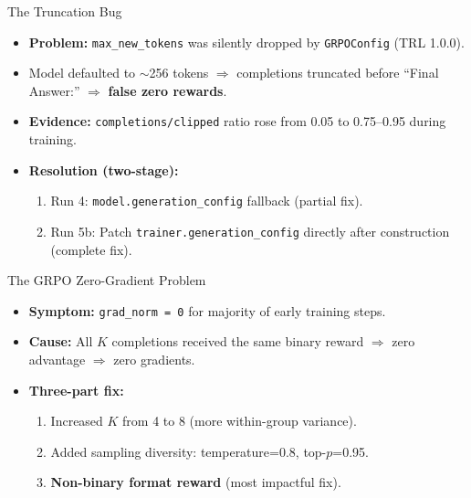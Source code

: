 \documentclass[10pt]{beamer}
\begin{document}
\begin{frame}{The Truncation Bug}
\large
\begin{itemize}
    \item<1-> \textbf{Problem:} \texttt{max\_new\_tokens} was silently dropped by \texttt{GRPOConfig} (TRL 1.0.0).
    \vspace{0.2cm}

    \item<1-> Model defaulted to $\sim$256 tokens $\Rightarrow$ completions truncated before ``Final Answer:'' $\Rightarrow$ \textbf{false zero rewards}.
    \vspace{0.2cm}

    \item<2-> \textbf{Evidence:} \texttt{completions/clipped} ratio rose from 0.05 to 0.75--0.95 during training.
    \vspace{0.2cm}

    \item<3-> \textbf{Resolution (two-stage):}
    \begin{enumerate}
        \item Run 4: \texttt{model.generation\_config} fallback (partial fix).
        \item Run 5b: Patch \texttt{trainer.generation\_config} directly after construction (complete fix).
    \end{enumerate}
\end{itemize}
\end{frame}

\begin{frame}{The GRPO Zero-Gradient Problem}
\large
\begin{itemize}
    \item \textbf{Symptom:} \texttt{grad\_norm = 0} for majority of early training steps.
    \vspace{0.2cm}

    \item \textbf{Cause:} All $K$ completions received the same binary reward $\Rightarrow$ zero advantage $\Rightarrow$ zero gradients.
    \vspace{0.3cm}

    \item \textbf{Three-part fix:}
    \begin{enumerate}
        \item Increased $K$ from 4 to 8 (more within-group variance).
        \item Added sampling diversity: temperature=0.8, top-$p$=0.95.
        \item \textbf{Non-binary format reward} (most impactful fix).
    \end{enumerate}
\end{itemize}
\end{frame}
\end{document}
